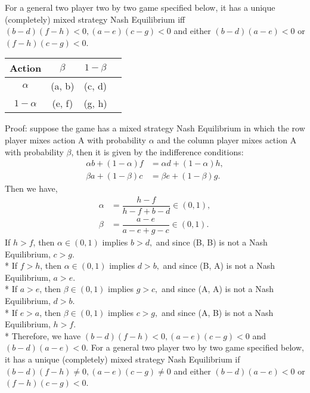 \documentclass{article}
\begin{document}
For a general two player two by two game specified below, it has a unique (completely) mixed strategy Nash Equilibrium iff $\left(b  - d\right)\left(f - h\right) < 0, \left(a  - e\right)\left(c - g\right) < 0$ and either $\left(b  - d\right)\left(a - e\right) < 0$ or $\left(f  - h\right)\left(c - g\right) < 0$.
\begin{center} \begin{tabular}{|c|c|c|c|}
\hline
 Action &$\beta$ &$1 - \beta$\\ \hline
$\alpha$ &(a, b) &(c, d)\\ \hline
$1 - \alpha$ &(e, f) &(g, h)\\ \hline
\end{tabular} \end{center}
Proof: suppose the game has a mixed strategy Nash Equilibrium in which the row player mixes action A with probability $\alpha$ and the column player mixes action A with probability $\beta$, then it is given by the indifference conditions:
\begin{align*}
\alpha b + \left(1 - \alpha\right) f &= \alpha d + \left(1 - \alpha\right) h,
\\ \beta a + \left(1 - \beta\right) c &= \beta e + \left(1 - \beta\right) g.
\end{align*}
Then we have,
\begin{align*}
\alpha &= \dfrac{h - f}{h - f + b - d} \in \left(0, 1\right),
\\ \beta &= \dfrac{a - e}{a - e + g - c} \in \left(0, 1\right).
\end{align*}
If $h  > f$, then $\alpha \in \left(0, 1\right)$ implies $b  > d,$ and since (B, B) is not a Nash Equilibrium, $c  > g.$
\\* If $f  > h$, then $\alpha \in \left(0, 1\right)$ implies $d  > b,$ and since (B, A) is not a Nash Equilibrium, $a  > e.$
\\* If $a  > e$, then $\beta \in \left(0, 1\right)$ implies $g  > c,$ and since (A, A) is not a Nash Equilibrium, $d  > b.$
\\* If $e  > a$, then $\beta \in \left(0, 1\right)$ implies $c  > g,$ and since (A, B) is not a Nash Equilibrium, $h  > f.$
\\* Therefore, we have $\left(b  - d\right)\left(f - h\right) < 0, \left(a  - e\right)\left(c - g\right) < 0$ and $\left(b  - d\right)\left(a - e\right) < 0$.
\newline \newline
For a general two player two by two game specified below, it has a unique (completely) mixed strategy Nash Equilibrium if $\left(b  - d\right)\left(f - h\right) \neq  0, \left(a  - e\right)\left(c - g\right) \neq  0$ and either $\left(b  - d\right)\left(a - e\right) < 0$ or $\left(f  - h\right)\left(c - g\right) < 0$.
\end{document}
